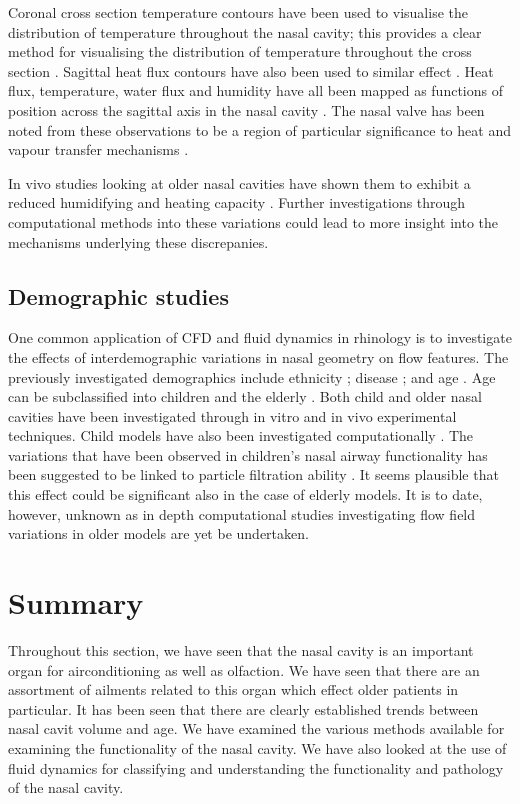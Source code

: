 Coronal cross section temperature contours have been used to visualise the distribution of temperature throughout the nasal cavity; this provides a clear method for visualising the distribution of temperature throughout the cross section \cite{Naftali2005}. Sagittal heat flux contours have also been used to similar effect \cite{Sullivan2013}. Heat flux, temperature, water flux and humidity have all been mapped as functions of position across the sagittal axis in the nasal cavity \cite{Garcia2007, Sullivan2013, Yu2014}. The nasal valve has been noted from these observations to be a region of particular significance to heat and vapour transfer mechanisms \cite{Sullivan2013}. 

In vivo studies looking at older nasal cavities have shown them to exhibit a reduced humidifying and heating capacity \cite{Lindemann2008}. Further investigations through computational methods into these variations could lead to more insight into the mechanisms underlying these discrepanies.

\subsection{Demographic studies}
One common application of CFD and fluid dynamics in rhinology is to investigate the effects of interdemographic variations in nasal geometry on flow features. The previously investigated demographics include ethnicity \cite{Zhu2011}; disease \cite{Garcia2007}; and  age \cite{Xi2012}. Age can be subclassified into children \cite{Xi2012} and the elderly \cite{Lindemann2008}. Both child and older nasal cavities have been investigated through in vitro \cite{Weinhold2004} and in vivo \cite{Kalmovich2005, Edelstein1996, WhanKim2007, Lindemann2008} experimental techniques. Child models have also been investigated computationally \cite{Xi2012}. The variations that have been observed in children's nasal airway functionality has been suggested to be linked to particle filtration ability \cite{Xi2012}. It seems plausible that this effect could be significant also in the case of elderly models. It is to date, however, unknown as in depth computational studies investigating flow field variations in older models are yet be undertaken.


\section{Summary}

Throughout this section, we have seen that the nasal cavity is an important organ for airconditioning as well as olfaction. We have seen that there are an assortment of ailments related to this organ which effect older patients in particular. It has been seen that there are clearly established trends between nasal cavit volume and age. We have examined the various methods available for examining the functionality of the nasal cavity. We have also looked at the use of fluid dynamics for classifying and understanding the functionality and pathology of the nasal cavity.

